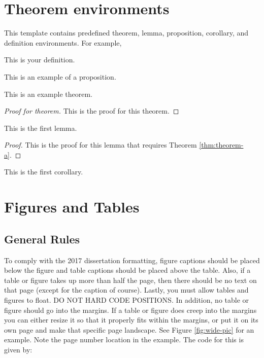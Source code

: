 \section{Theorem environments}
This template contains predefined theorem, lemma, proposition, corollary, and definition environments. For example,
\begin{definition}
	This is your definition.
\end{definition}
\begin{proposition}
	This is an example of a proposition.
\end{proposition}
\begin{theorem}\label{thm:theorem-a}
    This is an example theorem.
\end{theorem}
\begin{proof}[Proof for theorem]
    This is the proof for this theorem.
\end{proof}
\begin{lemma}
    This is the first lemma.
\end{lemma}
\begin{proof}
	This is the proof for this lemma that requires Theorem \ref{thm:theorem-a}.
\end{proof}
\begin{corollary}
    This is the first corollary.
\end{corollary}

\section{Figures and Tables}
\subsection{General Rules}
To comply with the 2017 dissertation formatting, figure captions should be placed below the figure and table captions should be placed above the table. Also, if a table or figure takes up more than half the page, then there should be no text on that page (except for the caption of course). Lastly, you must allow tables and figures to float. DO NOT HARD CODE POSITIONS. In addition, no table or figure should go into the margins. If a table or figure does creep into the margins you can either resize it so that it properly fits within the margins, or put it on its own page and make that specific page landscape. See Figure \ref{fig:wide-pic} for an example. Note the page number location in the example. The code for this is given by:

